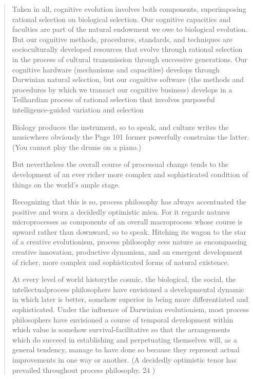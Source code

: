 \documentclass[a4paper]{Thesis}
\begin{document}
	\begin{quotation}
		Taken in all, cognitive evolution involves
		both components, superimposing rational selection on biological selection. Our cognitive
		capacities and faculties are part of the natural endowment we owe to biological
		evolution. But our cognitive methods, procedures, standards, and techniques are
		socioculturally developed resources that evolve through rational selection in the process
		of cultural transmission through successive generations. Our cognitive hardware
		(mechanisms and capacities) develops through Darwinian natural selection, but our
		cognitive software (the methods and procedures by which we transact our cognitive
		business) develops in a Teilhardian process of rational selection that involves purposeful
		intelligence-guided variation and selection
		
		Biology produces the instrument, so to speak,
		and culture writes the musicwhere obviously the
		Page 101
		former powerfully constrains the latter. (You cannot play the drums on a piano.)
		
		But
		nevertheless the overall course of processual change tends to the development of an ever
		richer more complex and sophisticated condition of things on the world's ample stage.
		
		
		Recognizing that this is so, process philosophy has always
		accentuated the positive and worn a decidedly optimistic mien. For it regards natures
		microprocesses as components of an overall macroprocess whose course is upward rather
		than downward, so to speak. Hitching its wagon to the star of a creative evolutionism,
		process philosophy sees nature as encompassing creative innovation, productive
		dynamism, and an emergent development of richer, more complex and sophisticated
		forms of natural existence.
		
		At every level of world historythe
		cosmic, the biological, the social, the intellectualprocess philosophers have envisioned a
		developmental dynamic in which later is better, somehow superior in being more
		differentiated and sophisticated. Under the influence of Darwinian evolutionism, most
		process philosophers have envisioned a course of temporal development within which
		value is somehow survival-facilitative so that the arrangements which do succeed in
		establishing and perpetuating themselves will, as a general tendency, manage to have
		done so because they represent actual improvements in one way or another. (A decidedly
		optimistic tenor has prevailed throughout process philosophy. 24 )
		

\end{quotation}
\end{document}
